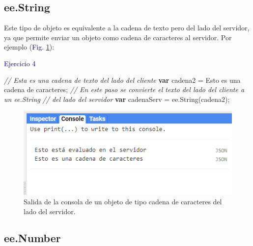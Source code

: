 \documentclass[
  12pt,
  letterpaper,
  twoside]{book}
\newenvironment{Shaded}{\begin{snugshade}}{\end{snugshade}}
\newcommand{\CommentTok}[1]{\textcolor[rgb]{0.24,0.58,0.00}{\textit{#1}}}
\newcommand{\FunctionTok}[1]{\textcolor[rgb]{0.48,0.12,0.64}{#1}}
\newcommand{\KeywordTok}[1]{\textcolor[rgb]{0.00,0.00,0.00}{\textbf{#1}}}
\newcommand{\NormalTok}[1]{#1}
\newcommand{\OperatorTok}[1]{\textcolor[rgb]{0.00,0.00,0.00}{#1}}
\newcommand{\StringTok}[1]{\textcolor[rgb]{0.87,0.29,0.22}{#1}}
\begin{document}
\hypertarget{ee.string}{%
\subsection*{ee.String}\label{ee.string}}

Este tipo de objeto es equivalente a la cadena de texto pero del lado del servidor, ya que permite enviar un objeto como cadena de caracteres al servidor. Por ejemplo (\textcolor{darkblue}{Fig.} \ref{fig:f57}):

\textcolor{darkblue}{Ejercicio 4}

\begin{Shaded}
\begin{Highlighting}[]
\CommentTok{// Esta es una cadena de texto del lado del cliente}
\KeywordTok{var}\NormalTok{ cadena2 }\OperatorTok{=} \StringTok{\textquotesingle{}Esto es una cadena de caracteres\textquotesingle{}}\OperatorTok{;}
\CommentTok{// En este paso se convierte el texto del lado del cliente a un ee.String}
\CommentTok{// del lado del servidor}
\KeywordTok{var}\NormalTok{ cadenaServ }\OperatorTok{=}\NormalTok{ ee}\OperatorTok{.}\FunctionTok{String}\NormalTok{(cadena2)}\OperatorTok{;}                         
\end{Highlighting}
\end{Shaded}

\begin{figure}[H]

{\centering \includegraphics[width=0.95\linewidth]{Img/ej4} 

}

\caption{Salida de la consola de un objeto de tipo cadena de caracteres del lado del servidor.}\label{fig:f57}
\end{figure}

\hypertarget{ee.number}{%
\subsection*{ee.Number}\label{ee.number}}
\end{document}
